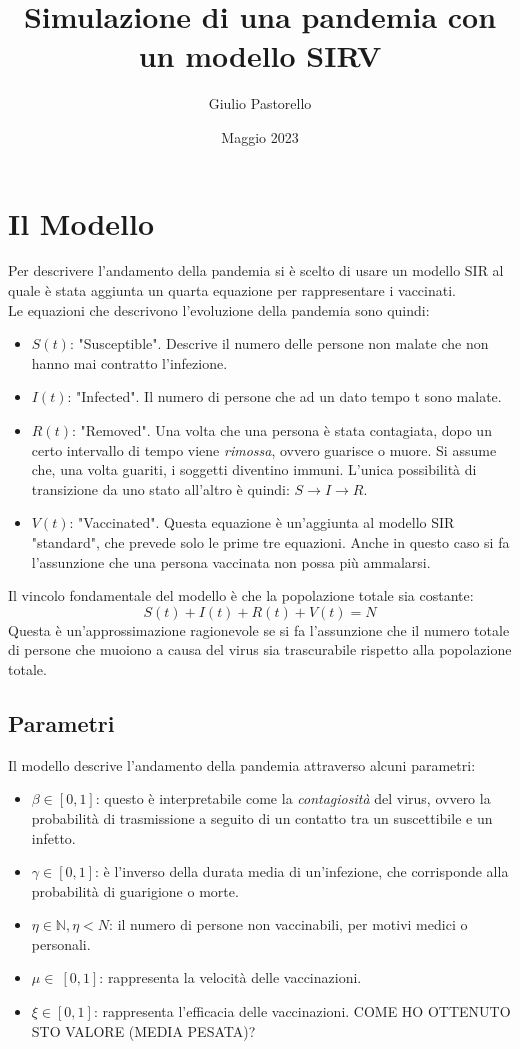 \documentclass{article}
\title{Simulazione di una pandemia con un modello SIRV}
\author{Giulio Pastorello }
\date{Maggio 2023}
\begin{document}
\maketitle

\section{Il Modello}

\hspace{\parindent} Per descrivere l'andamento della pandemia si è scelto di usare un modello SIR al quale è stata aggiunta un quarta equazione per rappresentare i vaccinati.\\
Le equazioni che descrivono l'evoluzione della pandemia sono quindi:
\begin{itemize}
\item $S(t)$: "Susceptible". Descrive il numero delle persone non malate che non hanno mai contratto l'infezione.
\item $I(t)$: "Infected". Il numero di persone che ad un dato tempo t sono malate. 
\item $R(t)$: "Removed". Una volta che una persona è stata contagiata, dopo un certo intervallo di tempo viene \textit{rimossa}, ovvero guarisce o muore. Si assume che, una volta guariti, i soggetti diventino immuni. L'unica possibilità di transizione da uno stato all'altro è quindi: $S\xrightarrow{}I\xrightarrow{}R$.
\item $V(t)$: "Vaccinated". Questa equazione è un'aggiunta al modello SIR "standard", che prevede solo le prime tre equazioni. Anche in questo caso si fa l'assunzione che una persona vaccinata non possa più ammalarsi.
\end{itemize}
Il vincolo fondamentale del modello è che la popolazione totale sia costante:\\
$$S(t)+I(t)+R(t)+V(t)=N$$
Questa è un'approssimazione ragionevole se si fa l'assunzione che il numero totale di persone che muoiono a causa del virus sia trascurabile rispetto alla popolazione totale.
\subsection{Parametri}
Il modello descrive l'andamento della pandemia attraverso alcuni parametri:
\begin{itemize} 
\item $\beta \in [0,1]$: questo è interpretabile come la \textit{contagiosità} del virus, ovvero la probabilità di trasmissione a seguito di un contatto tra un suscettibile e un infetto.
\item $\gamma \in [0,1]$: è l'inverso della durata media di un'infezione, che corrisponde alla probabilità di guarigione o morte.
\item $\eta \in \mathbb{N}, \eta < N$: il numero di persone non vaccinabili, per motivi medici o personali.
\item $\mu \in\ [0,1]$: rappresenta la velocità delle vaccinazioni.
\item $\xi \in [0,1]$: rappresenta l'efficacia delle vaccinazioni. COME HO OTTENUTO STO VALORE (MEDIA PESATA)?
\end{itemize}
\end{document}
